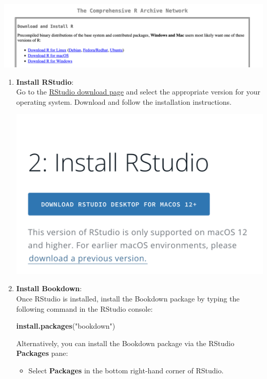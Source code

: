 \documentclass[
]{book}
\newenvironment{Shaded}{\begin{snugshade}}{\end{snugshade}}
\newcommand{\FunctionTok}[1]{\textcolor[rgb]{0.13,0.29,0.53}{\textbf{#1}}}
\newcommand{\NormalTok}[1]{#1}
\newcommand{\StringTok}[1]{\textcolor[rgb]{0.31,0.60,0.02}{#1}}
\theoremstyle{definition}
\theoremstyle{definition}
\theoremstyle{definition}
\theoremstyle{definition}
\theoremstyle{remark}
\begin{document}
\includegraphics[width=27.33in]{images/tutorialscreenshots/installR}

\begin{enumerate}
\def\labelenumi{\arabic{enumi}.}
\setcounter{enumi}{1}
\item
  \textbf{Install RStudio}:\\
  Go to the \href{https://posit.co/download/rstudio-desktop/}{RStudio download page} and select the appropriate version for your operating system. Download and follow the installation instructions.

  \includegraphics[width=16.83in]{images/tutorialscreenshots/installRStudio}
\item
  \textbf{Install Bookdown}:\\
  Once RStudio is installed, install the Bookdown package by typing the following command in the RStudio console:

\begin{Shaded}
\begin{Highlighting}[]
\FunctionTok{install.packages}\NormalTok{(}\StringTok{"bookdown"}\NormalTok{)}
\end{Highlighting}
\end{Shaded}

  Alternatively, you can install the Bookdown package via the RStudio \textbf{Packages} pane:

  \begin{itemize}
  \item
    Select \textbf{Packages} in the bottom right-hand corner of RStudio.


\end{itemize}
\end{enumerate}
\end{document}
